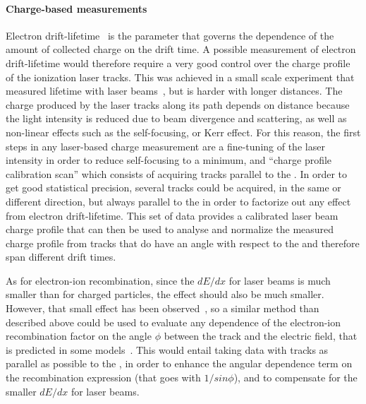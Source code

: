 \paragraph{Charge-based measurements}

Electron drift-lifetime~\cite{bib:uBlifetime, Antonello:2014eha} is the parameter that governs the dependence of the amount of collected charge on the drift time. A possible measurement of electron drift-lifetime would therefore require a very good control over the charge profile of the ionization laser tracks. This was achieved in a small scale experiment that measured lifetime with laser beams~\cite{Ereditato:2013xaa}, but is harder with longer distances. The charge produced by the laser tracks along its path depends on distance because the light intensity is reduced due to beam divergence and scattering, as well as non-linear effects such as the self-focusing, or Kerr effect. For this reason, the first steps in any laser-based charge measurement are a fine-tuning of the laser intensity in order to reduce self-focusing to a minimum, and ``charge profile calibration scan'' which consists of acquiring tracks parallel to the . In order to get good statistical precision, several tracks could be acquired, in the same or different direction, but always parallel to the  in order to factorize out any effect from electron drift-lifetime. This set of data provides a calibrated laser beam charge profile that can then be used to analyse and normalize the measured charge profile from tracks that do have an angle with respect to the  and therefore span different drift times.

As for electron-ion recombination, since the $dE/dx$ for laser beams is much smaller than for charged particles, the effect should also be much smaller. However, that small effect has been observed~\cite{Badhrees:2010zz}, so a similar method than described above could be used to evaluate any dependence of the electron-ion recombination factor on the angle $\phi$ between the track and the electric field, that is predicted in some models~\cite{Acciarri:2013met}. This would entail taking data with tracks as parallel as possible to the \efield, in order to enhance the angular dependence term on the recombination expression (that goes with $1/sin \phi$), and to compensate for the smaller $dE/dx$ for laser beams.



